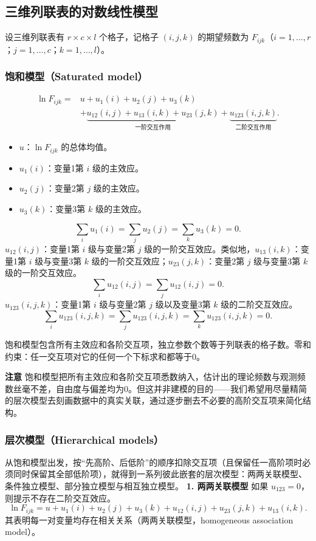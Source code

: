 \subsection{三维列联表的对数线性模型}
设三维列联表有 $r\times c\times l$ 个格子，记格子 $(i,j,k)$ 的期望频数为 $F_{ijk}$（$i=1,\ldots,r$；$j=1,\ldots,c$；$k=1,\ldots,l$）。
\subsubsection{饱和模型（Saturated model）}
\begin{align*}
\ln F_{ijk}={}&u+u_1(i)+u_2(j)+u_3(k)\\
&+\underbrace{u_{12}(i,j)+u_{13}(i,k)+u_{23}(j,k)}_{\text{一阶交互作用}}
+\underbrace{u_{123}(i,j,k)}_{\text{二阶交互作用}}.
\end{align*}
\begin{itemize}
\item $u$：$\ln F_{ijk}$ 的总体均值。
\item $u_1(i)$：变量1第 $i$ 级的主效应。
\item $u_2(j)$：变量2第 $j$ 级的主效应。
\item $u_3(k)$：变量3第 $k$ 级的主效应。
\end{itemize}
\[
\sum_i u_1(i)=\sum_j u_2(j)=\sum_k u_3(k)=0.
\]
$u_{12}(i,j)$：变量1第 $i$ 级与变量2第 $j$ 级的一阶交互效应。类似地，$u_{13}(i,k)$：变量1第 $i$ 级与变量3第 $k$ 级的一阶交互效应；$u_{23}(j,k)$：变量2第 $j$ 级与变量3第 $k$ 级的一阶交互效应。
\[
\sum_i u_{12}(i,j)=\sum_j u_{12}(i,j)=0.
\]
$u_{123}(i,j,k)$：变量1第 $i$ 级与变量2第 $j$ 级以及变量3第 $k$ 级的二阶交互效应。
\[
\sum_i u_{123}(i,j,k)=\sum_j u_{123}(i,j,k)=\sum_k u_{123}(i,j,k)=0.
\]
\begin{annotation}饱和模型包含所有主效应和各阶交互项，独立参数个数等于列联表的格子数。零和约束：任一交互项对它的任何一个下标求和都等于0。\end{annotation}
\textbf{注意} 饱和模型把所有主效应和各阶交互项悉数纳入，估计出的理论频数与观测频数丝毫不差，自由度与偏差均为0。但这并非建模的目的——我们希望用尽量精简的层次模型去刻画数据中的真实关联，通过逐步删去不必要的高阶交互项来简化结构。
\subsubsection{层次模型（Hierarchical models）}
从饱和模型出发，按“先高阶、后低阶”的顺序扣除交互项（且保留任一高阶项时必须同时保留其全部低阶项），就得到一系列彼此嵌套的层次模型：两两关联模型、条件独立模型、部分独立模型与相互独立模型。
\textbf{1. 两两关联模型} 如果 $u_{123}=0$，则提示不存在二阶交互效应。
\[
\ln F_{ijk}=u+u_1(i)+u_2(j)+u_3(k)+u_{12}(i,j)+u_{23}(j,k)+u_{13}(i,k).
\]
其表明每一对变量均存在相关关系（两两关联模型，homogeneous association model）。

